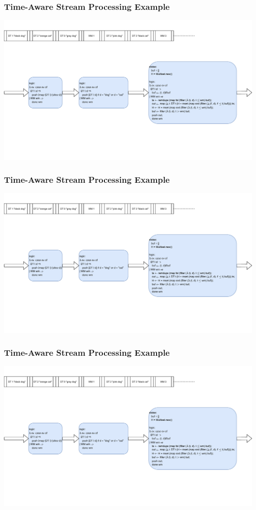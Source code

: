 \documentclass[aspectratio=169,10pt]{beamer}
\begin{document}
\begin{frame}
  \frametitle{Time-Aware Stream Processing Example}
    \includegraphics[page=8,width=.95\textwidth]{dataflow_ex1.pdf}
\end{frame}

\begin{frame}
  \frametitle{Time-Aware Stream Processing Example}
    \includegraphics[page=9,width=.95\textwidth]{dataflow_ex1.pdf}
\end{frame}

\begin{frame}
  \frametitle{Time-Aware Stream Processing Example}
    \includegraphics[page=10,width=.95\textwidth]{dataflow_ex1.pdf}
\end{frame}
\end{document}
